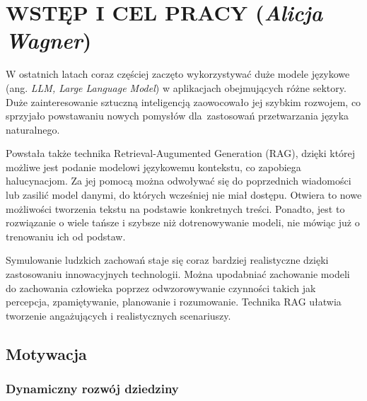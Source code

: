 \chapter{WSTĘP I CEL PRACY (\textit{Alicja Wagner})}
\label{chap:introduction}


W ostatnich latach coraz częściej zaczęto wykorzystywać duże modele językowe (ang. \textit{LLM, Large Language Model}) w aplikacjach obejmujących różne sektory. Duże zainteresowanie sztuczną inteligencją zaowocowało jej szybkim rozwojem, co sprzyjało powstawaniu nowych pomysłów dla~zastosowań przetwarzania języka naturalnego.

Powstała także technika Retrieval-Augumented Generation (RAG), dzięki której możliwe jest podanie modelowi językowemu kontekstu, co zapobiega halucynacjom. Za jej pomocą można odwoływać się do poprzednich wiadomości lub zasilić model danymi, do których wcześniej nie miał dostępu. Otwiera to nowe możliwości tworzenia tekstu na podstawie konkretnych treści. Ponadto, jest to rozwiązanie o wiele tańsze i szybsze niż dotrenowywanie modeli, nie mówiąc już o trenowaniu ich od podstaw.

Symulowanie ludzkich zachowań staje się coraz bardziej realistyczne dzięki zastosowaniu innowacyjnych technologii. Można upodabniać zachowanie modeli do zachowania człowieka poprzez odwzorowywanie czynności takich jak percepcja, zpamiętywanie, planowanie i rozumowanie. Technika RAG ułatwia tworzenie angażujących i realistycznych scenariuszy.


\section{Motywacja}


\subsection{Dynamiczny rozwój dziedziny}

